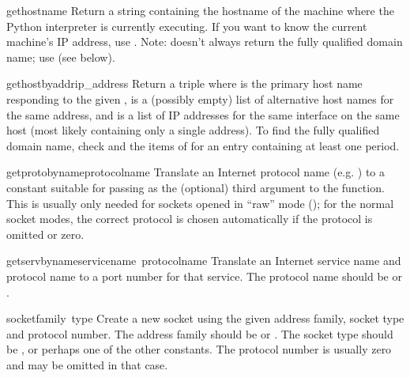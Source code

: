 \begin{funcdesc}{gethostname}{}
Return a string containing the hostname of the machine where 
the Python interpreter is currently executing.  If you want to know the
current machine's IP address, use
.
Note:  doesn't always return the fully qualified
domain name; use 
(see below).
\end{funcdesc}

\begin{funcdesc}{gethostbyaddr}{ip_address}
Return a triple  where
 is the primary host name responding to the given
,  is a (possibly empty) list of
alternative host names for the same address, and  is
a list of IP addresses for the same interface on the same
host (most likely containing only a single address).
To find the fully qualified domain name, check  and the
items of  for an entry containing at least one period.
\end{funcdesc}

\begin{funcdesc}{getprotobyname}{protocolname}
Translate an Internet protocol name (e.g. ) to a constant
suitable for passing as the (optional) third argument to the
 function.  This is usually only needed for sockets
opened in ``raw'' mode (); for the normal socket modes,
the correct protocol is chosen automatically if the protocol is
omitted or zero.
\end{funcdesc}

\begin{funcdesc}{getservbyname}{servicename\, protocolname}
Translate an Internet service name and protocol name to a port number
for that service.  The protocol name should be  or
.
\end{funcdesc}

\begin{funcdesc}{socket}{family\, type}
Create a new socket using the given address family, socket type and
protocol number.  The address family should be  or
.  The socket type should be ,
 or perhaps one of the other  constants.
The protocol number is usually zero and may be omitted in that case.
\end{funcdesc}


